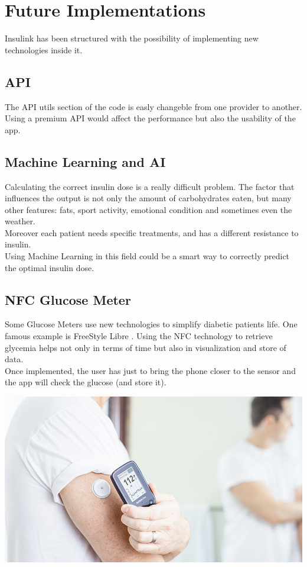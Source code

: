 \documentclass[12pt,hidelinks]{article}
\begin{document}
\newpage
{}
\section{Future Implementations}
\vspace{10.5cm}
Insulink has been structured with the possibility of implementing new technologies inside it.
\subsection{API}
The API utils section of the code is easly changeble from one provider to another. Using a premium API
would affect the performance but also the usability of the app.
\subsection{Machine Learning and AI}
Calculating the correct insulin dose is a really difficult problem. The factor that influences the output is not only the amount of carbohydrates eaten,
but many other features: fats, sport activity, emotional condition and sometimes even the weather.\\
Moreover each patient needs specific treatments, and has a different resistance to insulin.\\
Using Machine Learning in this field could be a smart way to correctly predict the optimal insulin dose. 

\newpage
\subsection{NFC Glucose Meter}
Some Glucose Meters use new technologies to simplify diabetic patients life. One famous example is
FreeStyle Libre \cite{FreeStyle}. Using the NFC technology to retrieve glycemia helps not only in terms 
of time but also in visualization and store of data. \\
Once implemented, the user has just to bring the phone closer to the sensor and the app will check the 
glucose (and store it).
\begin{center}

	\includegraphics[scale=0.45]{FreeStyle Libre}
\end{center}
\end{document}
